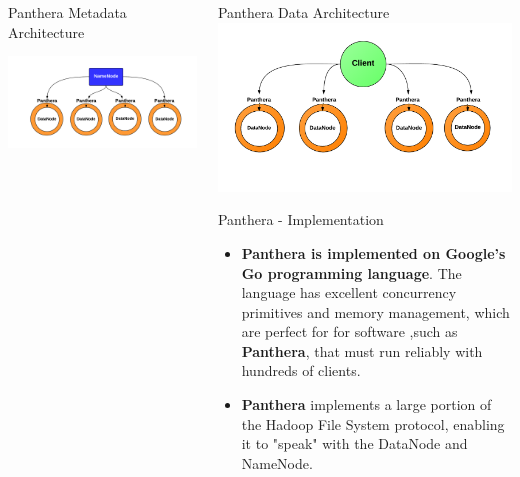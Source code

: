\documentclass[final]{beamer} %
\begin{document}
\begin{frame}
\begin{columns}[t]
\begin{column}{0.32\textwidth}
	    	  
		\begin{block}{Panthera Metadata Architecture}
	 		\centerline{\includegraphics[scale=1.5]{assets/panthera_metadata_large.pdf}}
      	\end{block}

     \end{column}

    \begin{column}{0.32\textwidth}
      
      \begin{block}{Panthera Data Architecture}
      \includegraphics[scale=1.2]{assets/panthera_data_large.pdf}
     \end{block}
      
	\begin{block}{Panthera - Implementation}
	\begin{itemize}
		\item \textbf{Panthera is implemented on Google's Go programming language}. The language has excellent concurrency primitives and memory management, which are perfect for
		for software ,such as \textbf{Panthera}, that must run reliably with hundreds of clients.
		\item \textbf{Panthera} implements a large portion of the Hadoop File System protocol, enabling it to "speak" with the DataNode and NameNode.
	\end{itemize}
	\end{block}


\end{column}
\end{columns}
\end{frame}
\end{document}
